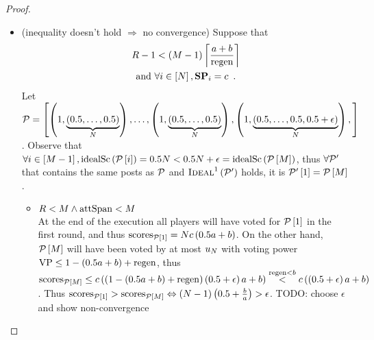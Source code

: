 \begin{proof}
\begin{itemize}
    \item (inequality doesn't hold $\Rightarrow$ no convergence) Suppose that
    \begin{gather}
      \label{conv:proof:fewrounds}
      \rounds - 1 < \left(\postlen - 1\right)\ceil*{\frac{a+b}{\regen}} \\
      \text{and } \forall i \in \left[\playerlen\right], \stpowvec_i = c
      \enspace. \nonumber
    \end{gather}
    Let $\mathcal{P} = \left[\left(1, \underbrace{\left(0.5, \dots,
    0.5\right)}_{N}\right), \dots, \left(1, \underbrace{\left(0.5,
    \dots, 0.5\right)}_{N}\right),\left(1, \underbrace{\left(0.5,
    \dots, 0.5, 0.5+\epsilon\right)}_{N}\right),\right]$. Observe that
    $\forall i \in \left[M - 1\right], \mathrm{idealSc}\left(\mathcal{P}\left[i\right]\right) =
    0.5N < 0.5N + \epsilon =
    \mathrm{idealSc}\left(\mathcal{P}\left[M\right]\right)$, thus $\forall \mathcal{P}'$ that
    contains the same posts as $\mathcal{P}$ and
    $\textsc{Ideal}^1\left(\mathcal{P}'\right)$ holds, it is
    $\mathcal{P}'\left[1\right] = \mathcal{P}\left[M\right]$.

    \begin{itemize}
      \item $R < M \wedge \mathrm{attSpan} < M$ \\
      At the end of the execution all players will have voted for
      $\mathcal{P}\left[1\right]$ in the first round, and thus
      $\mathrm{scores}_{\mathcal{P}\left[1\right]} = N c \left(0.5a +
      b\right)$. On the other hand, $\mathcal{P}\left[M\right]$ will have
      been voted by at most $u_N$ with voting power $\mathrm{VP} \leq 1 -
      \left(0.5a + b\right) + \mathrm{regen}$, thus \\
      $\mathrm{scores}_{\mathcal{P}\left[M\right]} \leq c \left(\left(1 -
      \left(0.5a + b\right) + \mathrm{regen}\right)\left(0.5 + \epsilon\right)a +
      b\right) \overset{\mathrm{regen} < b}{<} c\left(\left(0.5 + \epsilon\right)a +
      b\right)$. Thus $\mathrm{scores}_{\mathcal{P}\left[1\right]} >
      \mathrm{scores}_{\mathcal{P}\left[M\right]} \Leftrightarrow \left(N
      - 1\right)\left(0.5 + \frac{b}{a}\right) > \epsilon$. TODO: choose
      $\epsilon$ and show non-convergence


\end{itemize}
\end{itemize}
\end{proof}
